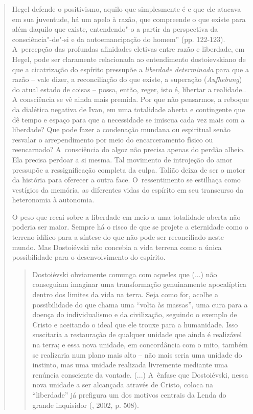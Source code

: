 {\begin{quote}
{  Hegel defende o positivismo, aquilo que simplesmente é e que ele
  atacava em sua juventude, há um apelo à razão, que compreende o que
  existe para além daquilo que existe, entendendo"-o a partir da
  perspectiva da consciência"-de"-si e da autoemancipação do homem'' (pp.
  122-123). A~percepção das profundas afinidades eletivas entre razão e
  liberdade, em Hegel, pode ser claramente relacionada ao entendimento
  dostoievskiano de que a cicatrização do espírito pressupõe a
  \emph{liberdade determinada} para que a razão -- vale dizer, a
  reconciliação do que existe, a superação (\emph{Aufhebung}) do atual
  estado de coisas -- possa, então, reger, isto é, libertar a realidade.}.
A consciência se vê ainda mais premida. Por que não pensarmos, a reboque
da dialética negativa de Ivan, em uma totalidade aberta e contingente
que dê tempo e espaço para que a necessidade se imiscua cada vez mais
com a liberdade? Que pode fazer a condenação mundana ou espiritual senão
resvalar o arrependimento por meio do encarceramento físico ou
reencarnado? A~consciência do algoz não precisa apenas do perdão alheio.
Ela precisa perdoar a si mesma. Tal movimento de introjeção do amor
pressupõe a ressignificação completa da culpa. Talião deixa de ser o
motor da história para oferecer a outra face. O~ressentimento se
estilhaça como vestígios da memória, as diferentes vidas do espírito em
seu transcurso da heteronomia à autonomia.

O peso que recai sobre a liberdade em meio a uma totalidade aberta não
poderia ser maior. Sempre há o risco de que se projete a eternidade como
o terreno idílico para a síntese do que não pode ser reconciliado neste
mundo. Mas Dostoiévski não concebia a vida terrena como a única
possibilidade para o desenvolvimento do espírito.

\begin{quote}
Dostoiévski obviamente comunga com aqueles que (...) não conseguiam
imaginar uma transformação genuinamente apocalíptica dentro dos limites
da vida na terra. Seja como for, acolhe a possibilidade do que chama uma
``volta às massas'', uma cura para a doença do individualismo e da
civilização, seguindo o exemplo de Cristo e aceitando o ideal que ele
trouxe para a humanidade. Isso suscitaria a restauração de qualquer
unidade que ainda é realizável na terra; e essa nova unidade, em
concordância com o mito, também se realizaria num plano mais alto -- não
mais seria uma unidade do instinto, mas uma unidade realizada livremente
mediante uma renúncia consciente da vontade. (...) A~ênfase que
Dostoiévski, nessa nova unidade a ser alcançada através de Cristo,
coloca na ``liberdade'' já prefigura um dos motivos centrais da Lenda do
grande inquisidor (, 2002, p. 508).
\end{quote}


\end{quote}}
